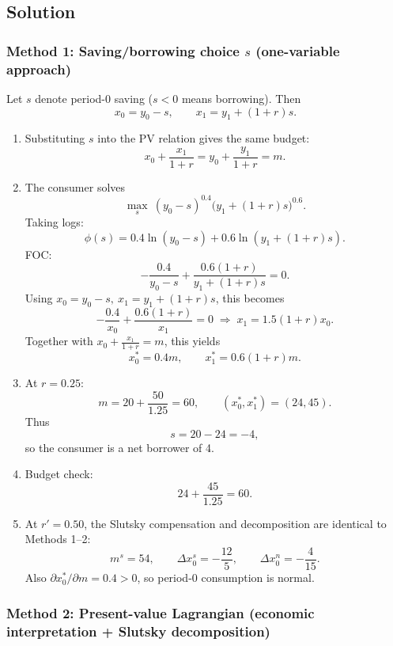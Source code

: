 \documentclass[12pt]{article}
\begin{document}
\bigskip
\newpage
\subsection*{Solution}

\subsubsection*{Method 1: Saving/borrowing choice \(s\) (one-variable approach)}

Let \(s\) denote period-0 saving (\(s<0\) means borrowing). Then
\[
x_0=y_0-s,\qquad x_1=y_1+(1+r)s.
\]

\begin{enumerate}[label=(\alph*)]
\item Substituting \(s\) into the PV relation gives the same budget:
\[
x_0+\frac{x_1}{1+r}=y_0+\frac{y_1}{1+r}=m.
\]

\item The consumer solves
\[
\max_s\ (y_0-s)^{0.4}\big(y_1+(1+r)s\big)^{0.6}.
\]
Taking logs:
\[
\phi(s)=0.4\ln(y_0-s)+0.6\ln(y_1+(1+r)s).
\]
FOC:
\[
-\frac{0.4}{y_0-s}+\frac{0.6(1+r)}{y_1+(1+r)s}=0.
\]
Using \(x_0=y_0-s,\ x_1=y_1+(1+r)s\), this becomes
\[
-\frac{0.4}{x_0}+\frac{0.6(1+r)}{x_1}=0
\;\Longrightarrow\;
x_1=1.5(1+r)x_0.
\]
Together with \(x_0+\frac{x_1}{1+r}=m\), this yields
\[
\boxed{x_0^*=0.4m,\qquad x_1^*=0.6(1+r)m.}
\]

\item At \(r=0.25\):
\[
m=20+\frac{50}{1.25}=60,\qquad (x_0^*,x_1^*)=(24,45).
\]
Thus
\[
s=20-24=-4,
\]
so the consumer is a net borrower of 4.

\item Budget check:
\[
24+\frac{45}{1.25}=60.
\]

\item At \(r'=0.50\), the Slutsky compensation and decomposition are identical to Methods 1--2:
\[
\boxed{m^s=54,\qquad \Delta x_0^s=-\frac{12}{5},\qquad \Delta x_0^n=-\frac{4}{15}.}
\]
Also \(\partial x_0^*/\partial m=0.4>0\), so period-0 consumption is normal.
\end{enumerate}

\newpage
\subsubsection*{Method 2: Present-value Lagrangian (economic interpretation + Slutsky decomposition)}
\end{document}
